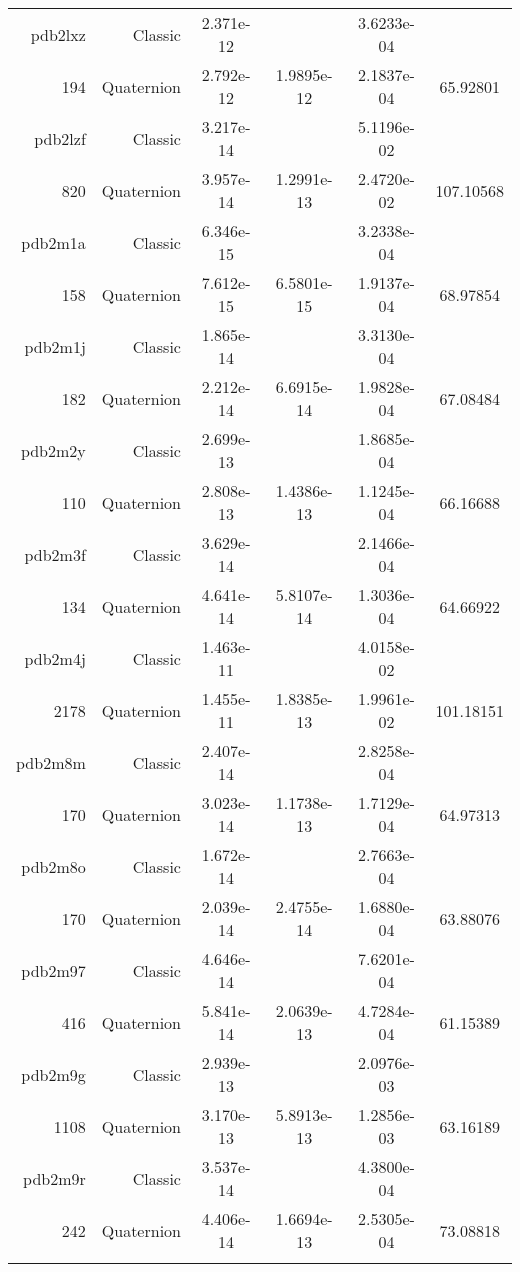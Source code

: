 \begin{xltabular}{\textwidth}{r|rS[table-format=1.3e+2]S[table-format=1.4e+2]S[table-format=1.4e+2]S[table-format=-1.5]}
pdb2lxz & Classic & 2.371e-12 &  & 3.6233e-04 & \\
194 & Quaternion & 2.792e-12 & 1.9895e-12 & 2.1837e-04 & 65.92801\\  \addlinespace
pdb2lzf & Classic & 3.217e-14 &  & 5.1196e-02 & \\
820 & Quaternion & 3.957e-14 & 1.2991e-13 & 2.4720e-02 & 107.10568\\  \addlinespace
pdb2m1a & Classic & 6.346e-15 &  & 3.2338e-04 & \\
158 & Quaternion & 7.612e-15 & 6.5801e-15 & 1.9137e-04 & 68.97854\\  \addlinespace
pdb2m1j & Classic & 1.865e-14 &  & 3.3130e-04 & \\
182 & Quaternion & 2.212e-14 & 6.6915e-14 & 1.9828e-04 & 67.08484\\  \addlinespace
pdb2m2y & Classic & 2.699e-13 &  & 1.8685e-04 & \\
110 & Quaternion & 2.808e-13 & 1.4386e-13 & 1.1245e-04 & 66.16688\\  \addlinespace
pdb2m3f & Classic & 3.629e-14 &  & 2.1466e-04 & \\
134 & Quaternion & 4.641e-14 & 5.8107e-14 & 1.3036e-04 & 64.66922\\  \addlinespace
pdb2m4j & Classic & 1.463e-11 &  & 4.0158e-02 & \\
2178 & Quaternion & 1.455e-11 & 1.8385e-13 & 1.9961e-02 & 101.18151\\  \addlinespace
pdb2m8m & Classic & 2.407e-14 &  & 2.8258e-04 & \\
170 & Quaternion & 3.023e-14 & 1.1738e-13 & 1.7129e-04 & 64.97313\\  \addlinespace
pdb2m8o & Classic & 1.672e-14 &  & 2.7663e-04 & \\
170 & Quaternion & 2.039e-14 & 2.4755e-14 & 1.6880e-04 & 63.88076\\  \addlinespace
pdb2m97 & Classic & 4.646e-14 &  & 7.6201e-04 & \\
416 & Quaternion & 5.841e-14 & 2.0639e-13 & 4.7284e-04 & 61.15389\\  \addlinespace
pdb2m9g & Classic & 2.939e-13 &  & 2.0976e-03 & \\
1108 & Quaternion & 3.170e-13 & 5.8913e-13 & 1.2856e-03 & 63.16189\\  \addlinespace
pdb2m9r & Classic & 3.537e-14 &  & 4.3800e-04 & \\
242 & Quaternion & 4.406e-14 & 1.6694e-13 & 2.5305e-04 & 73.08818\\  \addlinespace

\end{xltabular}
